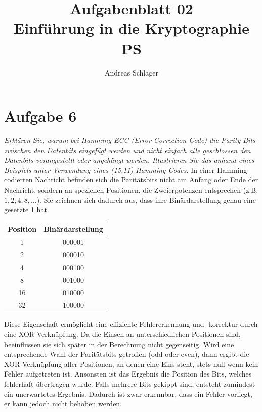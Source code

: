 \documentclass{article}
\title{{\Huge Aufgabenblatt 02}\\Einführung in die Kryptographie PS}
\author{Andreas Schlager}
\begin{document}
    \maketitle
    \tableofcontents
    \section{Aufgabe 6}
    \textit{Erklären Sie, warum bei Hamming ECC (Error Correction Code) die Parity Bits zwischen den Datenbits
    eingefügt werden und nicht einfach alle geschlossen den Datenbits vorangestellt oder
    angehängt werden. Illustrieren Sie das anhand eines Beispiels unter Verwendung
    eines (15,11)-Hamming Codes.}\vspace*{1em}\newline
    In einer Hamming-codierten Nachricht befinden sich die Paritätsbits nicht am Anfang oder Ende der Nachricht, 
    sondern an speziellen Positionen, die Zweierpotenzen entsprechen (z.B. $1, 2, 4, 8, \dots$).
    Sie zeichnen sich dadurch aus, dass ihre Binärdarstellung genau eine gesetzte 1 hat.
    \begin{center}
        \begin{tabular}{c|c} 
            \textbf{Position} & \textbf{Binärdarstellung}\\\hline
            1 & 000001\\
            2 & 000010\\
            4 & 000100\\
            8 & 001000\\
            16 & 010000\\
            32 & 100000
        \end{tabular}
    \end{center}
    Diese Eigenschaft ermöglicht eine effiziente Fehlererkennung und -korrektur durch eine XOR-Verknüpfung.
    Da die Einsen an unterschiedlichen Positionen sind, beeinflussen sie sich später in der Berechnung nicht gegenseitig.
    Wird eine entsprechende Wahl der Paritätsbits getroffen (odd oder even), dann ergibt die XOR-Verknüpfung 
    aller Positionen, an denen eine Eins steht, stets null wenn kein Fehler aufgetreten ist. Ansonsten ist das 
    Ergebnis die Position des Bits, welches fehlerhaft übertragen wurde. Falls mehrere Bits gekippt sind, 
    entsteht zumindest ein unerwartetes Ergebnis. Dadurch ist zwar erkennbar, dass ein Fehler vorliegt, 
    er kann jedoch nicht behoben werden.
\end{document}
